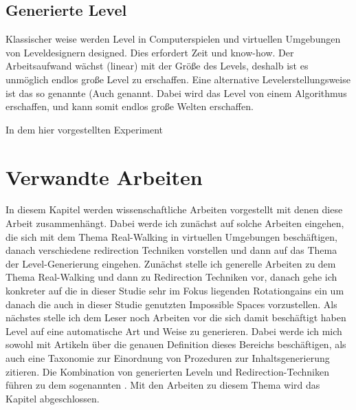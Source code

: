 \section{Generierte Level} %

Klassischer weise werden Level in Computerspielen und virtuellen Umgebungen von Leveldesignern designed. Dies erfordert Zeit und know-how. %
Der Arbeitsaufwand wächst (linear) mit der Größe des Levels, deshalb ist es unmöglich endlos große Level zu erschaffen. Eine alternative Levelerstellungsweise ist das so genannte (Auch  genannt. Dabei wird das Level von einem Algorithmus erschaffen, und kann somit endlos große Welten erschaffen.

In dem hier vorgestellten Experiment


\chapter{Verwandte Arbeiten}\label{chapter:relatedwork}

In diesem Kapitel werden wissenschaftliche Arbeiten vorgestellt mit denen diese Arbeit zusammenhängt. Dabei werde ich zunächst auf solche Arbeiten eingehen, die sich mit dem Thema Real-Walking in virtuellen Umgebungen beschäftigen, danach verschiedene redirection Techniken vorstellen und dann auf das Thema der Level-Generierung eingehen. Zunächst stelle ich generelle Arbeiten zu dem Thema Real-Walking und dann zu Redirection Techniken vor, danach gehe ich konkreter auf die in dieser Studie sehr im Fokus liegenden Rotationgains ein um danach die auch in dieser Studie genutzten Impossible Spaces vorzustellen. Als nächstes stelle ich dem Leser noch Arbeiten vor die sich damit beschäftigt haben Level auf eine automatische Art und Weise zu generieren. Dabei werde ich mich sowohl mit Artikeln über die genauen Definition dieses Bereichs beschäftigen, als auch eine Taxonomie zur Einordnung von Prozeduren zur Inhaltsgenerierung zitieren. Die Kombination von generierten Leveln und Redirection-Techniken führen zu dem sogenannten . Mit den Arbeiten zu diesem Thema wird das Kapitel abgeschlossen.

